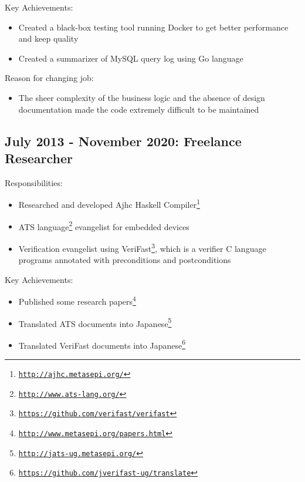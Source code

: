 \documentclass[letterpaper]{article}
\begin{document}
\noindent Key Achievements:

\begin{itemize}
  \item Created a black-box testing tool running Docker to get better performance and keep quality
  \item Created a summarizer of MySQL query log using Go language
\end{itemize}

\noindent Reason for changing job:

\begin{itemize}
  \item The sheer complexity of the business logic and the absence of design documentation made the code extremely difficult to be maintained
\end{itemize}

\subsection*{July 2013 - November 2020: Freelance Researcher}

\noindent Responsibilities:

\begin{itemize}
  \item Researched and developed Ajhc Haskell Compiler\footnote{\href{http://ajhc.metasepi.org/}{\tt http://ajhc.metasepi.org/}}
  \item ATS language\footnote{\href{http://www.ats-lang.org/}{\tt http://www.ats-lang.org/}} evangelist for embedded devices
  \item Verification evangelist using VeriFast\footnote{\href{https://github.com/verifast/verifast}{\tt https://github.com/verifast/verifast}}, which is a verifier C language programs annotated with preconditions and postconditions
\end{itemize}

\noindent Key Achievements:

\begin{itemize}
  \item Published some research papers\footnote{\href{http://www.metasepi.org/papers.html}{\tt http://www.metasepi.org/papers.html}}
  \item Translated ATS documents into Japanese\footnote{\href{http://jats-ug.metasepi.org/}{\tt http://jats-ug.metasepi.org/}}
  \item Translated VeriFast documents into Japanese\footnote{\href{https://github.com/jverifast-ug/translate}{\tt https://github.com/jverifast-ug/translate}}
\end{itemize}
\end{document}
